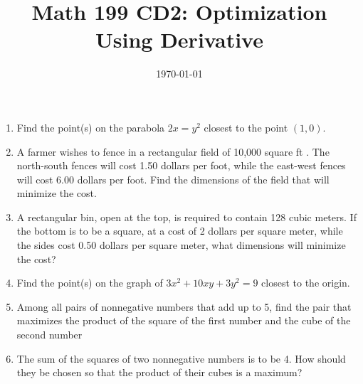 \documentclass[12pt]{article}
\title{Math 199 CD2: Optimization Using Derivative}
\date{\today}
\begin{document}
	
	\maketitle
	
	
	
	\begin{enumerate}
		\item Find the point(s) on the parabola $2x = y^2$ closest to the point $(1,0)$.

		\vskip 5cm

		\item A farmer wishes to fence in a rectangular field of 10,000 square ft . The north-south fences will cost 1.50 dollars per foot, while the east-west fences will cost 6.00 dollars per foot. Find the dimensions of the field that will minimize the cost.
		\vskip 5cm 

		\item A rectangular bin, open at the top, is required to contain 128 cubic meters. If the bottom is to be a square, at a cost of 2 dollars per square meter, while the sides cost 0.50 dollars per square meter, what dimensions will minimize the cost?
		\newpage

		\item Find the point(s) on the graph of $3x^2 + 10xy + 3y^2 = 9$ closest to the origin.		

		\vskip 5cm 

		\item Among all pairs of nonnegative numbers that add up to 5, find the pair that maximizes the product of the square of the first number and the cube of the second number
		\vskip 5cm

		\item The sum of the squares of two nonnegative numbers is to be 4. How should they be chosen so that the product of their cubes is a maximum?
	\end{enumerate}
	
\end{document}
